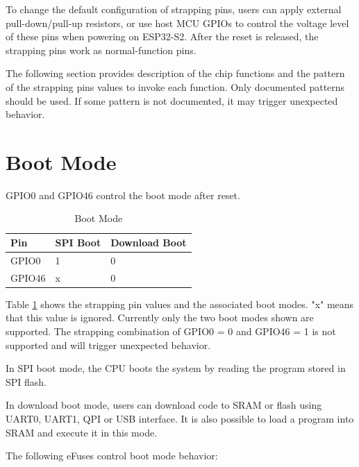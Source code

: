 \documentclass[main\_\_EN.tex]{subfiles}
\begin{document}
To change the default configuration of strapping pins, users can apply external pull-down/pull-up resistors, or use host MCU GPIOs to control the voltage level of these pins when powering on ESP32-S2. After the reset is released, the strapping pins work as normal-function pins.

\begin{tiplisting}
The following section provides description of the chip functions and the pattern of the strapping pins values to invoke each function. Only documented patterns should be used. If some pattern is not documented, it may trigger unexpected behavior.
\end{tiplisting} 

\section{Boot Mode}

GPIO0 and GPIO46 control the boot mode after reset.

\begin{longtable}[c]{|p{2.5cm}|p{2.5cm}|p{2.5cm}|}
\caption{Boot Mode}
\label{table:boot_mode}
    \\\hline
    \rowcolor{lightgray}
  Pin & SPI Boot & Download Boot \\ \hline
  GPIO0 & 1 & 0 \\ \hline
  GPIO46 & x & 0 \\ \hline
\end{longtable}

Table \ref{table:boot_mode} shows the strapping pin values and the associated boot modes. "x" means that this value is ignored. Currently only the two boot modes shown are supported. The strapping combination of GPIO0 = 0 and GPIO46 = 1 is not supported and will trigger unexpected behavior.

In SPI boot mode, the CPU boots the system by reading the program stored in SPI flash.

In download boot mode, users can download code to SRAM or flash using UART0, UART1, QPI or USB interface. It is also possible to load a program into SRAM and execute it in this mode.

The following eFuses control boot mode behavior:
\end{document}
